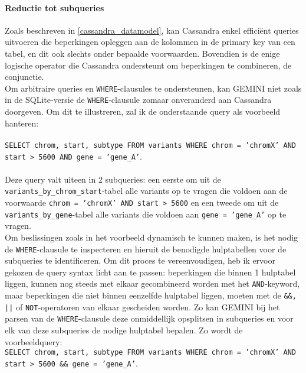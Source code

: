 \paragraph{Reductie tot subqueries}

Zoals beschreven in \ref{cassandra_datamodel}, kan Cassandra enkel effici\"ent queries uitvoeren die beperkingen opleggen aan de kolommen in de primary key van een tabel, en dit ook slechts onder bepaalde voorwaarden. Bovendien is de enige logische operator die Cassandra ondersteunt om beperkingen te combineren, de conjunctie.\\
Om arbitraire queries en \texttt{WHERE}-clausules te ondersteunen, kan GEMINI niet zoals in de SQLite-versie de \texttt{WHERE}-clausule zomaar onveranderd aan Cassandra doorgeven. Om dit te illustreren, zal ik de onderstaande query als voorbeeld hanteren:\\\\
\texttt{SELECT chrom, start, subtype FROM variants WHERE chrom = 'chromX' AND start > 5600 AND gene = 'gene\_A'}.\\\\
Deze query valt uiteen in 2 subqueries: een eerste om uit de \texttt{variants\_by\_chrom\_start}-tabel alle variants op te vragen die voldoen aan de voorwaarde \texttt{chrom = 'chromX' AND start > 5600} en een tweede om uit de \texttt{variants\_by\_gene}-tabel alle variants die voldoen aan \texttt{gene = 'gene\_A'} op te vragen.\\

Om beslissingen zoals in het voorbeeld dynamisch te kunnen maken, is het nodig de \texttt{WHERE}-clausule te inspecteren en hieruit de benodigde hulptabellen voor de subqueries te identificeren. Om dit proces te vereenvoudigen, heb ik ervoor gekozen de query syntax licht aan te passen: beperkingen die binnen 1 hulptabel liggen, kunnen nog steeds met elkaar gecombineerd worden met het \texttt{AND}-keyword, maar beperkingen die niet binnen eenzelfde hulptabel liggen, moeten met de \texttt{\&\&, ||} of \texttt{NOT}-operatoren van elkaar gescheiden worden. Zo kan GEMINI bij het parsen van de \texttt{WHERE}-clausule deze onmiddellijk opsplitsen in subqueries en voor elk van deze subqueries de nodige hulptabel bepalen. Zo wordt de voorbeeldquery:\\

\texttt{SELECT chrom, start, subtype FROM variants WHERE chrom = 'chromX' AND start > 5600 \&\& gene = 'gene\_A'}.\\

